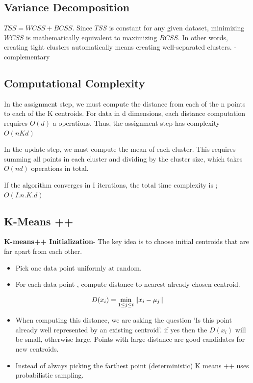 \documentclass[10pt,a4paper]{article}
\begin{document}
	\subsection{Variance Decomposition}

	$TSS=WCSS+BCSS$. Since $TSS$ is constant for any given dataset, minimizing $WCSS$ is mathematically equivalent to maximizing $BCSS$. In other words, creating tight clusters automatically means creating well-separated clusters. - complementary

	\subsection{Computational Complexity}
	In the assignment step, we must compute the distance from each of the n points to each of the K centroids. For data in d dimensions, each distance computation requires $O(d)$ a operations. Thus, the assignment step has complexity $O(nKd)$

	In the update step, we must compute the mean of each cluster. This requires summing all points in each cluster and dividing by the cluster size, which takes $O(nd)$ operations in total.

	If the algorithm converges in I iterations, the total time complexity is ; $O(I.n.K.d)$

	\subsection{K-Means ++}

	\textbf{K-means++ Initialization}- The key idea is to choose initial centroids that are far apart from each other.

	\begin{itemize}
		\item Pick one data point uniformly at random.
		\item For each data point , compute distance to nearest already chosen centroid.
	\end{itemize}


	\begin{align*}\Large D(x_i)=\min_{1 \le j \le t}\|x_i - \mu_j\|\end{align*}


	\begin{itemize}
		\item When computing this distance, we are asking the question 'Is this point already well represented by an existing centroid'. if yes then the $D(x_i)$ will be small, otherwise large. Points with large distance are good candidates for new centroids.
		\item Instead of always picking the farthest point (deterministic) K means ++ uses probabilistic sampling.
	\end{itemize}
\end{document}
